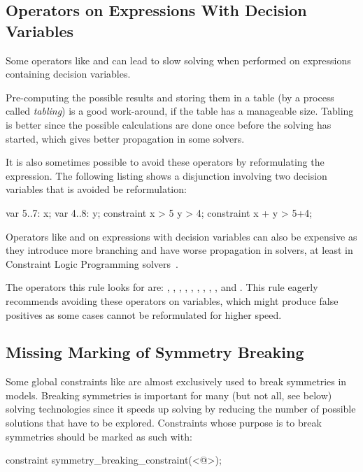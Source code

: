 \documentclass[a4paper,12pt]{article}
\begin{document}
\subsection{Operators on Expressions With Decision Variables}\label{sec:rule:opvar}
Some operators like  and  can lead to slow solving when performed on 
expressions containing decision variables. 

Pre-computing the possible results and storing them in a table
(by a process called \emph{tabling}) is a good work-around, if the table has a manageable size. Tabling is
better since the possible calculations are done once before 
the solving has started, which gives better propagation in some solvers.

It is also sometimes possible to avoid these operators by reformulating the expression.
The following listing shows a disjunction involving two decision variables that is avoided be reformulation:
\begin{mznnobreak}
var 5..7: x;
var 4..8: y;
constraint x > 5 \/ y > 4; %
constraint x + y > 5+4;    %
\end{mznnobreak}

Operators like \mi{\\/} and \mi{->} on expressions with decision variables can also be expensive as they introduce
more branching and have worse propagation in solvers, at least in Constraint Logic
Programming solvers~\cite[p.~430]{constraintshandbook}.

The operators this rule looks for are: \mi{^}, , , \mi{/}, , \mi{\/}, \mi{->}, \mi{<-}, \mi{<->}, and .
This rule eagerly recommends avoiding these operators on variables, 
which might produce false positives as some cases cannot be reformulated for higher speed.

\subsection{Missing Marking of Symmetry Breaking}\label{sec:rule:symbreak}
Some global constraints like  are almost exclusively used to break
symmetries in models. Breaking symmetries is important for many (but not all, see below) solving technologies since it speeds up solving by
reducing the number of possible solutions that have to be explored. Constraints whose
purpose is to break symmetries should be marked as such with:
\begin{mznnobreak}
constraint symmetry_breaking_constraint(<@\dots@>);
\end{mznnobreak}
\end{document}
